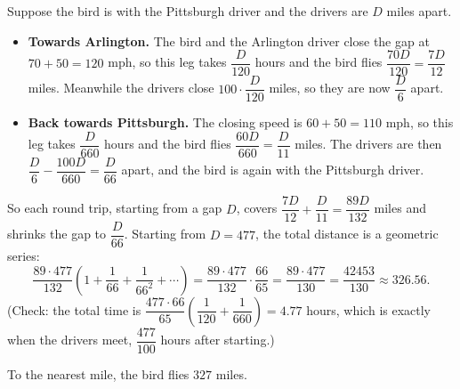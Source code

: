 Suppose the bird is with the Pittsburgh driver and the drivers are $D$ miles apart.
\begin{itemize}
\item \textbf{Towards Arlington.} The bird and the Arlington driver close the gap at $70+50=120$ mph, so this leg takes $\dfrac{D}{120}$ hours and the bird flies $\dfrac{70D}{120}=\dfrac{7D}{12}$ miles. Meanwhile the drivers close $100\cdot\dfrac{D}{120}$ miles, so they are now $\dfrac D6$ apart.
\item \textbf{Back towards Pittsburgh.} The closing speed is $60+50=110$ mph, so this leg takes $\dfrac{D}{660}$ hours and the bird flies $\dfrac{60D}{660}=\dfrac{D}{11}$ miles. The drivers are then $\dfrac D6-\dfrac{100D}{660}=\dfrac{D}{66}$ apart, and the bird is again with the Pittsburgh driver.
\end{itemize}
So each round trip, starting from a gap $D$, covers $\dfrac{7D}{12}+\dfrac{D}{11}=\dfrac{89D}{132}$ miles and shrinks the gap to $\dfrac D{66}$. Starting from $D=477$, the total distance is a geometric series:
\[\dfrac{89\cdot477}{132}\left(1+\dfrac1{66}+\dfrac1{66^2}+\cdots\right)=\dfrac{89\cdot477}{132}\cdot\dfrac{66}{65}=\dfrac{89\cdot477}{130}=\dfrac{42453}{130}\approx326.56.\]
(Check: the total time is $\dfrac{477\cdot66}{65}\left(\dfrac1{120}+\dfrac1{660}\right)=4.77$ hours, which is exactly when the drivers meet, $\dfrac{477}{100}$ hours after starting.)

To the nearest mile, the bird flies $\boxed{327}$ miles.
